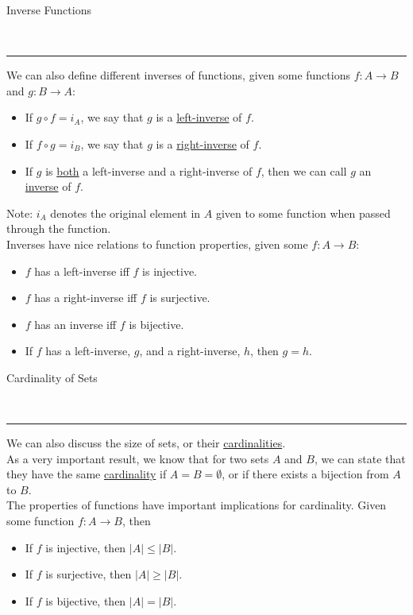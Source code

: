 \documentclass{article}
\newcommand{\header}[1]{\begin{large}\noindent #1\end{large}\\\rule{\textwidth}{0.5pt}}
\newcommand{\gap}{\medskip\\}
\begin{document}
\header{Inverse Functions}
We can also define different inverses of functions, given some functions $f: A \to B$ and $g: B \to A$:
\begin{itemize}
    \item If $g\circ f = i_A$, we say that $g$ is a \underline{left-inverse} of $f$.
    \item If $f \circ g = i_B$, we say that $g$ is a \underline{right-inverse} of $f$.
    \item If $g$ is \underline{both} a left-inverse and a right-inverse of $f$, then
    we can call $g$ an \underline{inverse} of $f$.
\end{itemize}
Note: $i_A$ denotes the original element in $A$ given to some function when passed
through the function. 
\gap
Inverses have nice relations to function properties, given some $f: A\to B$:
\begin{itemize}
    \item $f$ has a left-inverse iff $f$ is injective.
    \item $f$ has a right-inverse iff $f$ is surjective.
    \item $f$ has an inverse iff $f$ is bijective.
    \item If $f$ has a left-inverse, $g$, and a right-inverse, $h$, then $g = h$.
\end{itemize}

\header{Cardinality of Sets}
We can also discuss the size of sets, or their \underline{cardinalities}.
\gap
As a very important result, we know that for two sets $A$ and $B$, we can state that 
they have the same \underline{cardinality} if $A = B = \emptyset$, or if there exists
a bijection from $A$ to $B$.
\gap
The properties of functions have important implications for cardinality. Given 
some function $f: A \to B$, then 
\begin{itemize}
    \item If $f$ is injective, then $|A| \leq |B|$.
    \item If $f$ is surjective, then $|A| \geq |B|$.
    \item If $f$ is bijective, then $|A| = |B|$.
\end{itemize}
\end{document}
